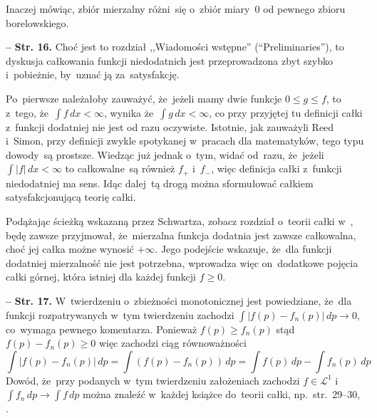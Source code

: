 \documentclass[a4paper,11pt]{article}
\newcommand{\spaceFour}{0.5em}
\newcommand{\tb}{\textbf}
\newcommand{\noi}{\noindent}
\newcommand{\tb}{\textbf}
\newcommand{\noi}{\noindent}
\newcommand{\start}{\noi \tb{--} {}}
\newcommand{\Str}[1]{\tb{Str. #1.}}
\newcommand{\mc}{\mathcal}
\newcommand{\ra}{\rightarrow}
\providecommand{\absj}[1]{\lvert #1 \rvert}
\newcommand{\Lc}{\mc{L}}
\newcommand{\dk}{\, d}  %
\newcommand{\Int}{\int\limits}
\newcommand{\LIj}{\Lc^{ 1 }}
\newcommand{\Int}{\int\limits}
\newcommand{\IntCaD}[2] { \Int #1 \, d#2 } %
\begin{document}
Inaczej mówiąc, zbiór mierzalny różni~się o~zbiór miary~0 od pewnego
zbioru borelowskiego. %

\vspace{\spaceFour}



\start \Str{16} Choć jest to rozdział ,,Wiadomości wstępne''
(``Preliminaries''), to dyskusja całkowania funkcji niedodatnich jest
przeprowadzona zbyt szybko i~pobieżnie, by~uznać ją za~satysfakcję.

Po~pierwsze należałoby zauważyć, że~jeżeli mamy dwie funkcje
$0 \leq g \leq f$, to z~tego, że~$\IntCaD{ f }{ x } < \infty$, wynika
że~$\IntCaD{ g }{ x } < \infty$, co przy przyjętej tu definicji całki
z~funkcji dodatniej nie jest od razu oczywiste. Istotnie, jak
zauważyli Reed i~Simon, przy definicji zwykle spotykanej w~pracach dla
matematyków, tego typu dowody~są prostsze. Wiedząc już jednak o~tym,
widać od~razu, że~jeżeli $\IntCaD{ \absj{ f } }{ x } < \infty$ to
całkowalne~są również $f_{ + }$ i~$f_{ - }$, więc definicja całki
z~funkcji niedodatniej ma sens. Idąc dalej~tą drogą można sformułować
całkiem satysfakcjonującą teorię całki.

Podążając ścieżką wskazaną przez Schwartza, zobacz rozdział o~teorii
całki w~\cite{SchwartzKursAnalizyMatematycznej79}, będę zawsze
przyjmował, że~mierzalna funkcja dodatnia jest zawsze całkowalna, choć
jej całka możne wynosić $+\infty$. Jego podejście wskazuje, że~dla
funkcji dodatniej mierzalność nie jest potrzebna, wprowadza więc
on~dodatkowe pojęcia całki górnej, która istniej dla każdej funkcji
$f \geq 0$. %


\vspace{\spaceFour}



\start \Str{17} W~twierdzeniu o~zbieżności monotonicznej jest
powiedziane, że~dla funkcji rozpatrywanych w~tym twierdzeniu zachodzi
$\int | f( p ) - f_{ n }( p ) | \dk p \ra 0$, co~wymaga pewnego
komentarza. Ponieważ $f( p ) \geq f_{ n }( p )$ stąd
$f( p ) - f_{ n }( p ) \geq 0$ więc zachodzi ciąg równoważności
\begin{equation*}
  \IntCaD{ | f( p ) - f_{ n }( p ) | }{ p } = \IntCaD{ ( f( p )
    - f_{ n }( p ) ) }{ p } = \IntCaD{ f( p ) }{ p }
  - \IntCaD{ f_{ n }( p ) }{ p }
\end{equation*}
Dowód, że~przy podanych w~tym twierdzeniu założeniach zachodzi
$f \in \LIj$ i~$\IntCaD{ f_{ n } }{ p } \ra \IntCaD{ f }{ p }$ można
znaleźć w~każdej książce do~teorii całki, np.~str.~29--30,
\cite{Rudin98}. %
\end{document}
